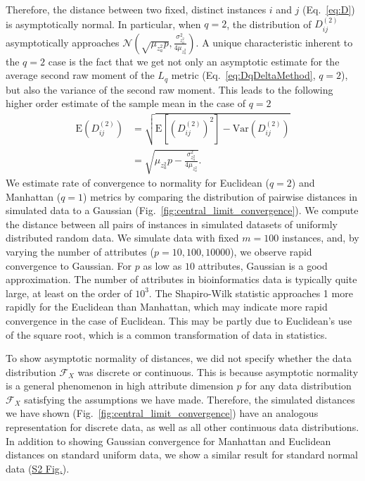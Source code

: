 \documentclass[10pt,letterpaper]{article}
\begin{document}
Therefore, the distance between two fixed, distinct instances $i$ and $j$ (Eq.~\ref{eq:D}) is asymptotically normal.
In particular, when $q = 2$, the distribution of $D_{ij}^{(2)}$ asymptotically approaches $\mathcal{N}\left(\sqrt{\mu_{z^2_a}p}, \frac{\sigma^2_{z^2_a}}{4\mu_{z^2_a}}\right)$. A unique characteristic inherent to the $q=2$ case is the fact that we get not only an asymptotic estimate for the average second raw moment of the $L_q$ metric (Eq.~\ref{eq:DqDeltaMethod}, $q=2$), but also the variance of the second raw moment. This leads to the following higher order estimate of the sample mean in the case of $q=2$
%
\begin{equation}\label{eq:DqImprovedExplained}
\begin{aligned}
\text{E}\left(D^{(2)}_{ij}\right) &= \sqrt{\text{E}\left[\left(D^{(2)}_{ij}\right)^2\right] - \text{Var}\left(D^{(2)}_{ij}\right)} \\
&= \sqrt{\mu_{z^2_a}p - \frac{\sigma^2_{z^2_a}}{4\mu_{z^2_a}}}.
\end{aligned}
\end{equation}
%
We estimate rate of convergence to normality for Euclidean ($q=2$) and Manhattan ($q=1$)  metrics by comparing the distribution of pairwise distances in simulated data to a Gaussian (Fig.~\ref{fig:central_limit_convergence}). We compute the distance between all pairs of instances in simulated datasets of uniformly distributed random data. We simulate data with fixed $m=100$ instances, and, by varying the number of attributes ($p=10,100,10000$), we observe rapid convergence to Gaussian. For $p$ as low as $10$ attributes, Gaussian is a good approximation. The number of attributes in bioinformatics data is typically quite large, at least on the order of $10^3$. The Shapiro-Wilk statistic approaches 1 more rapidly for the Euclidean than Manhattan, which may indicate more rapid convergence in the case of Euclidean. This may be partly due to Euclidean's use of the square root, which is a common transformation of data in statistics. 

To show asymptotic normality of distances, we did not specify whether the data distribution $\mathcal{F}_X$ was discrete or continuous. This is because asymptotic normality is a general phenomenon in high attribute dimension $p$ for any data distribution $\mathcal{F}_X$ satisfying the assumptions we have made. Therefore, the simulated distances we have shown (Fig.~\ref{fig:central_limit_convergence}) have an analogous representation for discrete data, as well as all other continuous data distributions. In addition to showing Gaussian convergence for Manhattan and Euclidean distances on standard uniform data, we show a similar result for standard normal data (\hyperlink{S2_Fig}{S2 Fig.}). 
\end{document}
